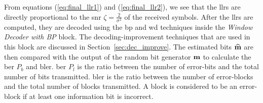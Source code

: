 From equations (\ref{eq:final_llr1}) and (\ref{eq:final_llr2}), we see that the \acp{llr} are directly proportional to the \ac{snr} $\zeta=\frac{2}{\sigma^2}$ of the received symbols. After the \acp{llr} are computed, they are decoded using the \ac{bp} and \ac{wd} techniques inside the \emph{Window Decoder with BP} block. The decoding-improvement techniques that are used in this block are discussed in Section~\ref{sec:dec_improve}. The estimated bits $\widehat{\mathbf{m}}$ are then compared with the output of the random bit generator $\mathbf{m}$ to calculate the \ac{ber} $P_b$ and \ac{bler}. \ac{ber} $P_l$ is the ratio between the number of error-bits and the total number of bits transmitted. \ac{bler} is the ratio between the number of error-blocks and the total number of blocks transmitted. A block is considered to be an error-block if at least one information bit is incorrect.